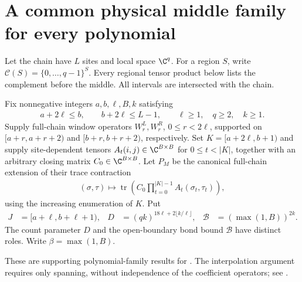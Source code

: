 \section{A common physical middle family for every polynomial}

Let the chain have $L$ sites and local space $\C^q$.
For a region $S$, write $\mathcal C(S)=\{0,\ldots,q-1\}^S$.
Every regional tensor product below lists the complement before the middle.
All intervals are intersected with the chain.

Fix nonnegative integers $a,b,\ell,B,k$ satisfying
\begin{align}
    a+2\ell\le b,\qquad b+2\ell\le L-1,\qquad
    \ell\ge1,\quad q\ge2,\quad k\ge1.
    \label{eq:physical_polynomial_family_hypotheses}
\end{align}
Supply full-chain window operators $W^L_r,W^R_r$, $0\le r<2\ell$,
supported on $[a+r,a+r+2)$ and
$[b+r,b+r+2)$, respectively.
Set $K=[a+2\ell,b+1)$ and supply site-dependent tensors
$A_t(i,j)\in\C^{B\times B}$ for $0\le t<|K|$, together with an arbitrary
closing matrix $C_0\in\C^{B\times B}$. Let $P_M$ be the canonical
full-chain extension of their trace contraction
\begin{align}
    (\sigma,\tau)\longmapsto
    \operatorname{tr}\left(C_0\prod_{t=0}^{|K|-1}A_t(\sigma_t,\tau_t)\right),
    \label{eq:physical_polynomial_supplied_core}
\end{align}
using the increasing enumeration of $K$. Put
\begin{align}
    J          & =[a+\ell,b+\ell+1),                    &
    D          & =(qk)^{18\ell+2\lfloor k/\ell\rfloor}, &
    \mathcal B & =(\max(1,B))^{2k}.
    \label{eq:physical_polynomial_two_bounds}
\end{align}
The count parameter $D$ and the open-boundary bond bound $\mathcal B$
have distinct roles. Write $\beta=\max(1,B)$.

These are supporting polynomial-family results for
\cite[Proposition~5.7]{Arad2016RigorousRG}.
The interpolation argument requires only spanning, without independence of
the coefficient operators; see
\cite{gap:aklv13_interpolation_and_word_count}.


